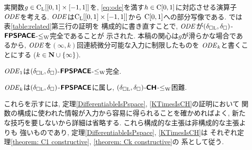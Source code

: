 実関数$g \in \mathrm C _{\mathrm L} [[0, 1] \times [-1, 1]]$を, 
\eqref{eq:ode}を満す$h \in \mathrm C [0, 1]$に対応させる演算子$\mathit{ODE}$を考える. 
$\mathit{ODE}$は$\mathrm C _{\mathrm L} [[0, 1] \times [-1, 1]]$から
$\mathrm C [0, 1]$への部分写像である. 
\cite[Theorem~4.9]{kawamura2010operators}では表\ref{table:related}第三行の証明を
構成的に書き直すことで, 
$\mathit{ODE}$が$(\delta _{\square \mathrm L}, \delta _\square)$-$\text{\bfseries \sffamily \upshape FPSPACE}$-$\leq _{\mathrm W}$完全であることが
示された. 
本稿の関心は$g$が滑らかな場合であるから, 
$\mathit{ODE}$を$(\infty, k)$回連続微分可能な入力に制限したものを
$\mathit{ODE} _k$と書くことにする ($k \in \mathbf N \cup \{\infty\}$). 

\begin{theorem}
\label{theorem: C1 constructive}
$\mathit{ODE} _1$は$(\delta _{\square \mathrm L}, \delta _\square)$-$\text{\bfseries \sffamily \upshape FPSPACE}$-$\leq _{\mathrm W}$完全. 
\end{theorem}

\begin{theorem}
\label{theorem: Ck constructive}
$\mathit{ODE} _k$は$(\delta _{\square \mathrm L}, \delta _\square)$-$\text{\bfseries \sffamily \upshape FPSPACE}$に属し, 
$(\delta _{\square \mathrm L}, \delta _\square)$-$\text{\bfseries \sffamily \upshape CH}$-$\leq _{\mathrm W}$困難. 
\end{theorem}

これらを示すには, 
定理\ref{DifferentiableIsPspace}, \ref{KTimesIsCH}の証明において
関数の構成に使われた情報が入力から容易に得られることを確かめればよく, 
新たな技巧を要しないから詳細は省略する. 
これら構成的な主張は非構成的な主張よりも
強いものであり\cite[Lemmas 3.7, 3.8]{kawamura2010operators}, 
定理\ref{DifferentiableIsPspace}, \ref{KTimesIsCH}は
それぞれ定理\ref{theorem: C1 constructive}, \ref{theorem: Ck constructive}の
系として従う. 


